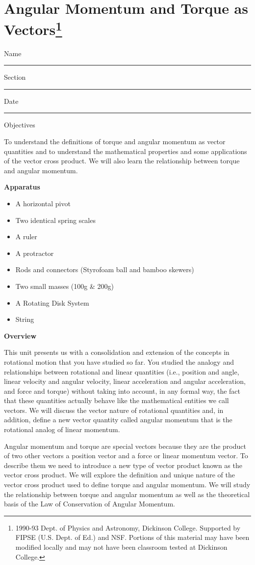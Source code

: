 \def\bmath#1{\mbox{\boldmath$#1$}} 


\section{Angular Momentum and Torque as Vectors\footnote{
1990-93 Dept. of Physics and Astronomy, Dickinson College. Supported by FIPSE
(U.S. Dept. of Ed.) and NSF. Portions of this material may have been modified
locally and may not have been classroom tested at Dickinson College.
}}

Name \rule{2.0in}{0.1pt}\hfill{}Section \rule{1.0in}{0.1pt}\hfill{}Date \rule{1.0in}{0.1pt}

Objectives 

To understand the definitions of torque and angular momentum as vector quantities
and to understand the mathematical properties and some applications of the vector
cross product. We will also learn the relationship between torque and angular
momentum.

\textbf{Apparatus}

\begin{itemize}
\item A horizontal pivot 
\item Two identical spring scales
\item A ruler 
\item A protractor 
\item Rods and connectors (Styrofoam ball and bamboo skewers)
\item Two small masses (100g \& 200g) 
\item A Rotating Disk System 
\item String 
\end{itemize}
\textbf{Overview} 

This unit presents us with a consolidation and extension of the concepts in
rotational motion that you have studied so far. You studied the analogy and
relationships between rotational and linear quantities (i.e., position and angle,
linear velocity and angular velocity, linear acceleration and angular acceleration,
and force and torque) without taking into account, in any formal way, the fact
that these quantities actually behave like the mathematical entities we call
vectors. We will discuss the vector nature of rotational quantities and, in
addition, define a new vector quantity called angular momentum that is the rotational
analog of linear momentum. 

Angular momentum and torque are special vectors because they are the product
of two other vectors a position vector and a force or linear momentum vector.
To describe them we need to introduce a new type of vector product known as
the vector cross product. We will explore the definition and unique nature of
the vector cross product used to define torque and angular momentum. We will
study the relationship between torque and angular momentum as well as the theoretical
basis of the Law of Conservation of Angular Momentum.

